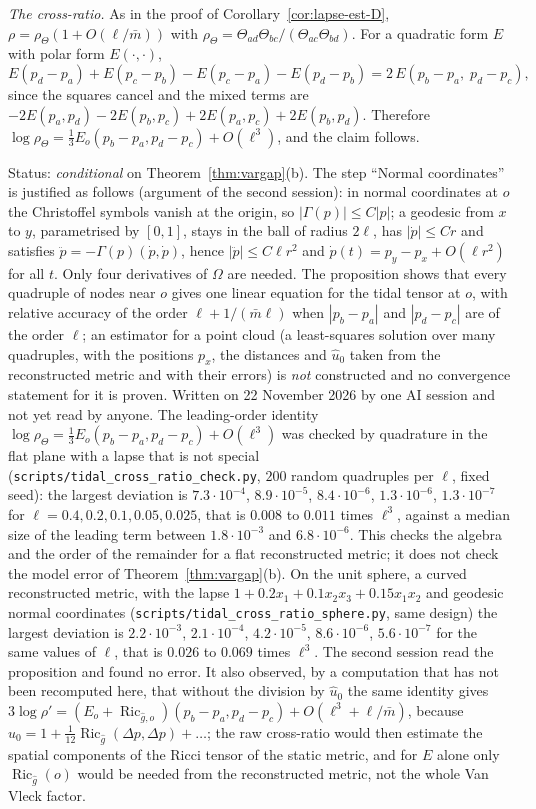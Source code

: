 \documentclass[11pt,a4paper]{article}
\makeatletter
\theoremstyle{stmt}
\theoremstyle{defn}
\theoremstyle{rmk}
\renewenvironment{proof}[1][\proofname]{\par\pushQED{\qed}\normalfont\topsep6\p@\@plus6\p@\relax
  \trivlist\item[\hskip\labelsep{\sffamily\itshape\small #1.}]\ignorespaces}{\popQED\endtrivlist\@endpefalse}
\numberwithin{equation}{section}
\DeclareMathOperator{\Ric}{Ric}
\newcommand{\status}[1]{\par\noindent\textsf{\small Status: #1}\par}
\makeatother
\begin{document}
{\begin{proof}
\emph{The cross-ratio.} As in the proof of Corollary~\ref{cor:lapse-est-D}, $\rho=\rho_\Theta(1+O(\ell/\bar m))$ with $\rho_\Theta=\Theta_{ad}\Theta_{bc}/(\Theta_{ac}\Theta_{bd})$. For a quadratic form $E$ with polar form $E(\cdot,\cdot)$,
\[
E(p_d-p_a)+E(p_c-p_b)-E(p_c-p_a)-E(p_d-p_b)=2\,E(p_b-p_a,\;p_d-p_c),
\]
since the squares cancel and the mixed terms are $-2E(p_a,p_d)-2E(p_b,p_c)+2E(p_a,p_c)+2E(p_b,p_d)$. Therefore $\log\rho_\Theta=\tfrac13E_o(p_b-p_a,p_d-p_c)+O(\ell^3)$, and the claim follows.
\end{proof}
\status{\emph{conditional} on Theorem~\ref{thm:vargap}(b). The step ``Normal coordinates'' is justified as follows (argument of the second session): in normal coordinates at $o$ the Christoffel symbols vanish at the origin, so $|\Gamma(p)|\le C|p|$; a geodesic from $x$ to $y$, parametrised by $[0,1]$, stays in the ball of radius $2\ell$, has $|\dot p|\le Cr$ and satisfies $\ddot p=-\Gamma(p)(\dot p,\dot p)$, hence $|\ddot p|\le C\ell r^2$ and $\dot p(t)=p_y-p_x+O(\ell r^2)$ for all $t$. Only four derivatives of $\Omega$ are needed. The proposition shows that every quadruple of nodes near $o$ gives one linear equation for the tidal tensor at $o$, with relative accuracy of the order $\ell+1/(\bar m\ell)$ when $|p_b-p_a|$ and $|p_d-p_c|$ are of the order $\ell$; an estimator for a point cloud (a least-squares solution over many quadruples, with the positions $p_x$, the distances and $\hat u_0$ taken from the reconstructed metric and with their errors) is \emph{not} constructed and no convergence statement for it is proven. Written on 22 November 2026 by one AI session and not yet read by anyone. The leading-order identity $\log\rho_\Theta=\tfrac13E_o(p_b-p_a,p_d-p_c)+O(\ell^3)$ was checked by quadrature in the flat plane with a lapse that is not special (\texttt{scripts/tidal\_cross\_ratio\_check.py}, $200$ random quadruples per $\ell$, fixed seed): the largest deviation is $7.3\cdot10^{-4}$, $8.9\cdot10^{-5}$, $8.4\cdot10^{-6}$, $1.3\cdot10^{-6}$, $1.3\cdot10^{-7}$ for $\ell=0.4,0.2,0.1,0.05,0.025$, that is $0.008$ to $0.011$ times $\ell^3$, against a median size of the leading term between $1.8\cdot10^{-3}$ and $6.8\cdot10^{-6}$. This checks the algebra and the order of the remainder for a flat reconstructed metric; it does not check the model error of Theorem~\ref{thm:vargap}(b). On the unit sphere, a curved reconstructed metric, with the lapse $1+0.2x_1+0.1x_2x_3+0.15x_1x_2$ and geodesic normal coordinates (\texttt{scripts/tidal\_cross\_ratio\_sphere.py}, same design) the largest deviation is $2.2\cdot10^{-3}$, $2.1\cdot10^{-4}$, $4.2\cdot10^{-5}$, $8.6\cdot10^{-6}$, $5.6\cdot10^{-7}$ for the same values of $\ell$, that is $0.026$ to $0.069$ times $\ell^3$. The second session read the proposition and found no error. It also observed, by a computation that has not been recomputed here, that without the division by $\hat u_0$ the same identity gives $3\log\rho'=(E_o+\Ric_{\hat g,o})(p_b-p_a,p_d-p_c)+O(\ell^3+\ell/\bar m)$, because $\hat u_0=1+\tfrac1{12}\Ric_{\hat g}(\Delta p,\Delta p)+\dots$; the raw cross-ratio would then estimate the spatial components of the Ricci tensor of the static metric, and for $E$ alone only $\Ric_{\hat g}(o)$ would be needed from the reconstructed metric, not the whole Van Vleck factor.}

}
\end{document}
